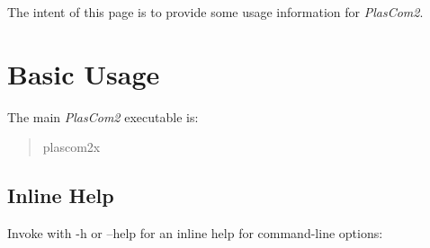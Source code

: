 The intent of this page is to provide some usage information for {\itshape Plas\+Com2}.\hypertarget{user_reference_basic}{}\section{Basic Usage}\label{user_reference_basic}
The main {\itshape Plas\+Com2} executable is\+:~\newline
 \begin{quote}
plascom2x \end{quote}
\hypertarget{user_reference_inlinehelp}{}\subsection{Inline Help}\label{user_reference_inlinehelp}
Invoke with -\/h or --help for an inline help for command-\/line options\+:~\newline
